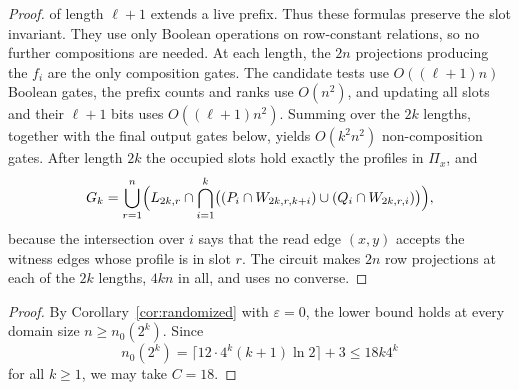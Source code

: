 \begin{proof}
of length $\ell+1$ extends a live prefix. Thus these formulas preserve
the slot invariant. They use only Boolean operations on row-constant
relations, so no further compositions are needed. At each length, the
$2n$ projections producing
the $f_i$ are the only composition gates. The candidate tests use
$O((\ell+1)n)$ Boolean gates, the prefix counts and ranks use
$O(n^2)$, and updating all slots and their $\ell+1$ bits uses
$O((\ell+1)n^2)$. Summing over the $2k$ lengths, together with the
final output gates below, yields $O(k^2n^2)$ non-composition gates.
After length $2k$ the occupied slots
hold exactly the profiles in $\Pi_x$, and
\[
 G_k=\bigcup_{r=1}^{n}\Bigl(L_{2k,r}\cap\bigcap_{i=1}^k
 \bigl((P_i\cap W_{2k,r,k+i})\cup(Q_i\cap W_{2k,r,i})\bigr)\Bigr),
\]
because the intersection over $i$ says that the read edge $(x,y)$
accepts the witness edges whose profile is in slot $r$. The circuit
makes $2n$ row projections
at each of the $2k$ lengths, $4kn$ in all, and uses no converse.
\end{proof}

\domainsize*
\begin{proof}
By Corollary~\ref{cor:randomized} with $\varepsilon=0$, the lower
bound holds at every domain size $n\ge n_0(2^k)$. Since
\[
n_0(2^k)=\lceil12\cdot4^k(k+1)\ln2\rceil+3\le18k4^k
\]
for all $k\ge1$, we may take $C=18$.
\end{proof}

